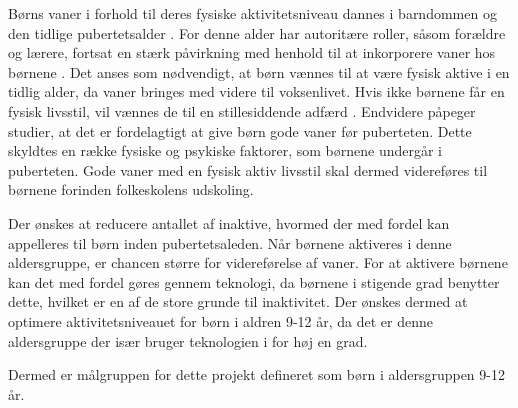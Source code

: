 Børns vaner i forhold til deres fysiske aktivitetsniveau dannes i barndommen og den tidlige pubertetsalder \citep{F.SallisG.Simons-MortonJ.Stone1992}. For denne alder har autoritære roller, såsom forældre og lærere, fortsat en stærk påvirkning med henhold til at inkorporere vaner hos børnene \citep{L.MeyerP.Gullotta2012}. \newline
Det anses som nødvendigt, at børn vænnes til at være fysisk aktive i en tidlig alder, da vaner bringes med videre til voksenlivet. Hvis ikke børnene får en fysisk livsstil, vil vænnes de til en stillesiddende adfærd \citep{Nabe-NielsenSundhedsministerietetal.2005,P.J.KremersBrug2008,L.MeyerP.Gullotta2012}. Endvidere påpeger studier, at det er fordelagtigt at give børn gode vaner før puberteten. Dette skyldtes en række fysiske og psykiske faktorer, som børnene undergår i puberteten. Gode vaner med en fysisk aktiv livsstil skal dermed videreføres til børnene forinden folkeskolens udskoling. 

Der ønskes at reducere antallet af inaktive, hvormed der med fordel kan appelleres til børn inden pubertetsaleden. Når børnene aktiveres i denne aldersgruppe, er chancen større for videreførelse af vaner. For at aktivere børnene kan det med fordel gøres gennem teknologi, da børnene i stigende grad benytter dette, hvilket er en af de store grunde til inaktivitet. Der ønskes dermed at optimere aktivitetsniveauet for børn i aldren 9-12 år, da det er denne aldersgruppe der især bruger teknologien i for høj en grad. 




Dermed er målgruppen for dette projekt defineret som børn i aldersgruppen 9-12 år.